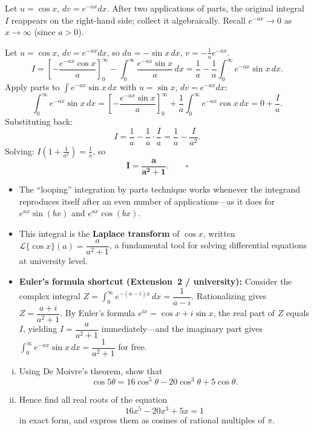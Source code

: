 \begin{hintbox}
Let $u = \cos x$, $dv = e^{-ax}dx$.  After two applications of parts, the original integral $I$
reappears on the right-hand side; collect it algebraically.  Recall $e^{-ax}\to 0$ as
$x\to\infty$ (since $a>0$).
\end{hintbox}

\begin{solution}
Let $u = \cos x$, $dv = e^{-ax}dx$, so $du = -\sin x\,dx$, $v = -\tfrac{1}{a}e^{-ax}$.
\[
I = \left[-\frac{e^{-ax}\cos x}{a}\right]_0^\infty
  - \int_0^\infty \frac{e^{-ax}\sin x}{a}\,dx
= \frac{1}{a} - \frac{1}{a}\int_0^\infty e^{-ax}\sin x\,dx.
\]
Apply parts to $\int e^{-ax}\sin x\,dx$ with $u = \sin x$, $dv = e^{-ax}dx$:
\[
\int_0^\infty e^{-ax}\sin x\,dx
= \left[-\frac{e^{-ax}\sin x}{a}\right]_0^\infty
+ \frac{1}{a}\int_0^\infty e^{-ax}\cos x\,dx
= 0 + \frac{I}{a}.
\]
Substituting back:
\[
I = \frac{1}{a} - \frac{1}{a}\cdot\frac{I}{a} = \frac{1}{a} - \frac{I}{a^2}.
\]
Solving: $I\!\left(1+\tfrac{1}{a^2}\right) = \tfrac{1}{a}$, so
\[
\mathbf{I = \frac{a}{a^2+1}}.\qquad\square
\]
\end{solution}

\begin{takeaways}
\begin{itemize}[leftmargin=*]
  \item The ``looping'' integration by parts technique works whenever the integrand reproduces
        itself after an even number of applications---as it does for $e^{ax}\sin(bx)$ and
        $e^{ax}\cos(bx)$.
  \item This integral is the \textbf{Laplace transform} of $\cos x$, written
        $\mathcal{L}\{\cos x\}(a) = \dfrac{a}{a^2+1}$, a fundamental tool for solving
        differential equations at university level.
  \item \textbf{Euler's formula shortcut (Extension~2 / university):} Consider the complex
        integral $Z = \int_0^\infty e^{-(a-i)x}\,dx = \dfrac{1}{a-i}$.  Rationalizing gives
        $Z = \dfrac{a+i}{a^2+1}$.  By Euler's formula $e^{ix}=\cos x+i\sin x$, the real
        part of $Z$ equals $I$, yielding $I = \dfrac{a}{a^2+1}$ immediately---and the
        imaginary part gives $\int_0^\infty e^{-ax}\sin x\,dx = \dfrac{1}{a^2+1}$ for free.
\end{itemize}
\end{takeaways}

\begin{problem}
\begin{enumerate}[(i)]
  \item Using De Moivre's theorem, show that
        \[
        \cos 5\theta = 16\cos^5\theta - 20\cos^3\theta + 5\cos\theta.
        \]
  \item Hence find all real roots of the equation
        \[
        16x^5 - 20x^3 + 5x = 1
        \]
        in exact form, and express them as cosines of rational multiples of $\pi$.
\end{enumerate}
\end{problem}

